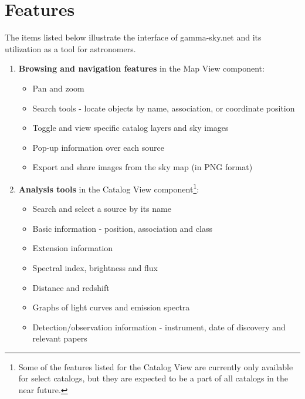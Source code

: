 \renewcommand{\thefootnote}{\fnsymbol{footnote}}

\section{Features}

The items listed below illustrate the interface of gamma-sky.net and its utilization as a tool for astronomers.

\begin{enumerate}

\item \textbf{Browsing and navigation features} in the Map View component:

\begin{itemize}
\item Pan and zoom
\item Search tools - locate objects by name, association, or coordinate position
\item Toggle and view specific catalog layers and sky images
\item Pop-up information over each source
\item Export and share images from the sky map (in PNG format)
\end{itemize}

\item \textbf{Analysis tools} in the Catalog View component\footnote[1]{Some of the features listed for the Catalog View are currently only available for select catalogs, but they are expected to be a part of all catalogs in the near future.}:

\begin{itemize}

\item Search and select a source by its name
\item Basic information - position, association and class
\item Extension information
\item Spectral index, brightness and flux
\item Distance and redshift
\item Graphs of light curves and emission spectra
\item Detection/observation information - instrument, date of discovery and relevant papers

\end{itemize}

\end{enumerate}

